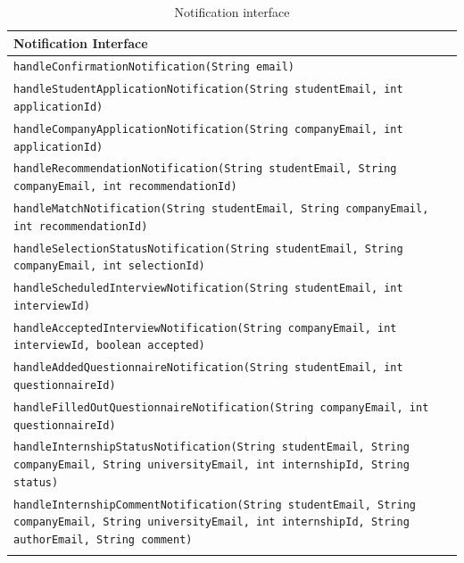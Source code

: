 \renewcommand{\arraystretch}{1.5}
\begin{longtable}{|p{14.5cm}|}
    \hline
    \cellcolor{customred}\textbf{Notification Interface} \\ \hline
    \texttt{handleConfirmationNotification(String email)} \\ \hline
    \texttt{handleStudentApplicationNotification(String studentEmail, int applicationId)} \\ \hline
    \texttt{handleCompanyApplicationNotification(String companyEmail, int applicationId)} \\ \hline
    \texttt{handleRecommendationNotification(String studentEmail, String companyEmail, int recommendationId)} \\ \hline
    \texttt{handleMatchNotification(String studentEmail, String companyEmail, int recommendationId)} \\ \hline
    \texttt{handleSelectionStatusNotification(String studentEmail, String companyEmail, int selectionId)} \\ \hline
    \texttt{handleScheduledInterviewNotification(String studentEmail, int interviewId)} \\ \hline
    \texttt{handleAcceptedInterviewNotification(String companyEmail, int interviewId, boolean accepted)} \\ \hline
    \texttt{handleAddedQuestionnaireNotification(String studentEmail, int questionnaireId)} \\ \hline
    \texttt{handleFilledOutQuestionnaireNotification(String companyEmail, int questionnaireId)} \\ \hline
    \texttt{handleInternshipStatusNotification(String studentEmail, String companyEmail, String universityEmail, int internshipId, String status)} \\ \hline
    \texttt{handleInternshipCommentNotification(String studentEmail, String companyEmail, String universityEmail, int internshipId, String authorEmail, String comment)} \\ \hline
\caption{Notification interface}
\end{longtable}

